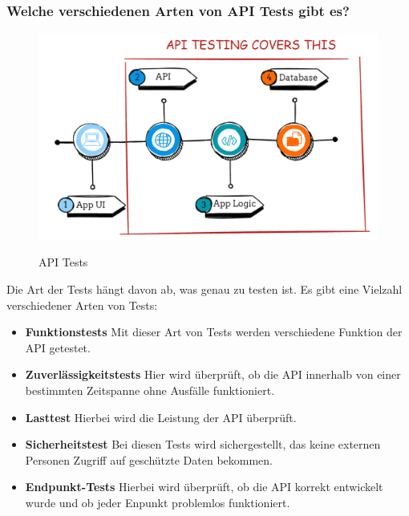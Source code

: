 \subsubsection{Welche verschiedenen Arten von API Tests gibt es?}

\begin{figure}[h!]
    \centering
    \includegraphics[width=0.8\linewidth]{pics/api-tests.png}
    \caption{API Tests}
    \label{fig:enter-label}
    \cite{api_testing_grafik}
\end{figure}


Die Art der Tests hängt davon ab, was genau zu testen ist. Es gibt eine Vielzahl verschiedener Arten von Tests:
\begin{itemize}
    \item \textbf{Funktionstests}
        \newline
        Mit dieser Art von Tests werden verschiedene Funktion der API getestet.
    \item \textbf{Zuverlässigkeitstests}
        \newline
        Hier wird überprüft, ob die API innerhalb von einer bestimmten Zeitspanne ohne Ausfälle funktioniert.
    \item \textbf{Lasttest}
        \newline
        Hierbei wird die Leistung der API überprüft. 
    \item \textbf{Sicherheitstest}
        \newline
        Bei diesen Tests wird sichergestellt, das keine externen Personen Zugriff auf geschützte Daten bekommen.
    \item \textbf{Endpunkt-Tests}
        \newline
        Hierbei wird überprüft, ob die API korrekt entwickelt wurde und ob jeder Enpunkt problemlos funktioniert.
\end{itemize}



